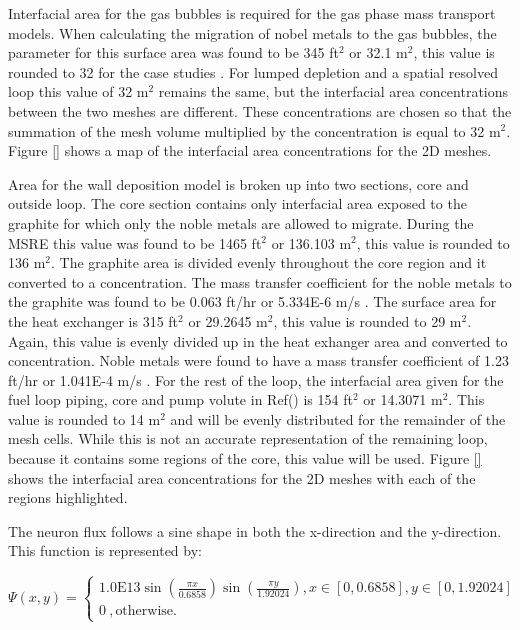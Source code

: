 Interfacial area for the gas bubbles is required for the gas phase mass transport models. When calculating the migration of nobel metals to the gas bubbles, the parameter for this surface area was found to be 345 ft$^{2}$ or 32.1 m$^{2}$, this value is rounded to 32 for the case studies \cite{kedl1972}. For lumped depletion and a spatial resolved loop this value of 32 m$^{2}$ remains the same, but the interfacial area concentrations between the two meshes are different. These concentrations are chosen so that the summation of the mesh volume multiplied by the concentration is equal to 32 m$^{2}$. Figure \ref{} shows a map of the interfacial area concentrations for the 2D meshes. 

Area for the wall deposition model is broken up into two sections, core and outside loop. The core section contains only interfacial area exposed to the graphite for which only the noble metals are allowed to migrate. During the MSRE this value was found to be 1465 ft$^{2}$ or 136.103 m$^{2}$, this value is rounded to 136 m$^{2}$. The graphite area is divided evenly throughout the core region and it converted to a concentration. The mass transfer coefficient for the noble metals to the graphite was found to be 0.063 ft/hr or 5.334E-6 m/s \cite{kedl1972}. The surface area for the heat exchanger is 315 ft$^{2}$ or 29.2645 m$^{2}$, this value is rounded to 29 m$^{2}$. Again, this value is evenly divided up in the heat exhanger area and converted to concentration. Noble metals were found to have a mass transfer coefficient of 1.23 ft/hr or 1.041E-4 m/s \cite{kedl1972}. For the rest of the loop, the interfacial area given for the fuel loop piping, core and pump volute in Ref(\cite{kedl1972}) is 154 ft$^{2}$ or 14.3071 m$^{2}$. This value is rounded to 14 m$^{2}$ and will be evenly distributed for the remainder of the mesh cells. While this is not an accurate representation of the remaining loop, because it contains some regions of the core, this value will be used. Figure \ref{} shows the interfacial area concentrations for the 2D meshes with each of the regions highlighted. 

The neuron flux follows a sine shape in both the x-direction and the y-direction. This function is represented by:


\begin{equation}
\Psi (x, y) = \begin{cases}
  1.0\text{E}13 \sin\left(\frac{\pi x}{0.6858}\right)\sin\left(\frac{\pi y}{1.92024}\right) , x \in [0,0.6858], y \in [0,1.92024] \\
  0\ , \text{otherwise}.
  \label{eq:msreflux}
\end{cases}
\end{equation}

